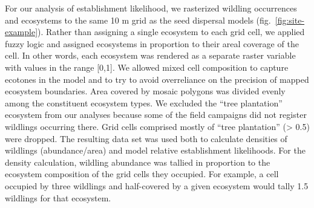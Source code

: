 \documentclass[
]{article}
\begin{document}
For our analysis of establishment likelihood, we rasterized wildling occurrences and ecosystems to the same 10 m grid as the seed dispersal models (fig.~\ref{fig:site-example}).
Rather than assigning a single ecosystem to each grid cell, we applied fuzzy logic and assigned ecosystems in proportion to their areal coverage of the cell.
In other words, each ecosystem was rendered as a separate raster variable with values in the range {[}0,1{]}.
We allowed mixed cell composition to capture ecotones in the model and to try to avoid overreliance on the precision of mapped ecosystem boundaries.
Area covered by mosaic polygons was divided evenly among the constituent ecosystem types.
We excluded the ``tree plantation'' ecosystem from our analyses because some of the field campaigns did not register wildlings occurring there.
Grid cells comprised mostly of ``tree plantation'' (\textgreater{} 0.5) were dropped.
The resulting data set was used both to calculate densities of wildlings (abundance/area) and model relative establishment likelihoods.
For the density calculation, wildling abundance was tallied in proportion to the ecosystem composition of the grid cells they occupied.
For example, a cell occupied by three wildlings and half-covered by a given ecosystem would tally 1.5 wildlings for that ecosystem.
\end{document}
